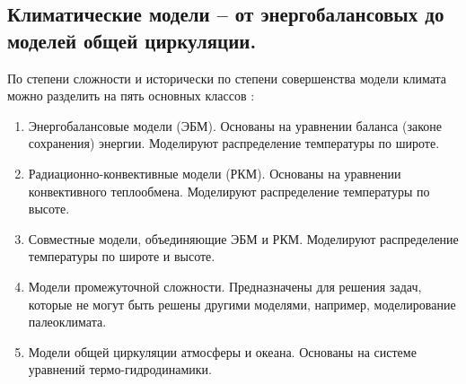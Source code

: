 \subsection{Климатические модели -- от энергобалансовых до моделей общей циркуляции.}
По степени сложности и исторически по степени совершенства модели климата можно разделить на пять основных классов \cite{Лобанов-2018}:
\begin{enumerate}
\item Энергобалансовые модели (ЭБМ). Основаны на уравнении баланса (законе сохранения) энергии. Моделируют распределение температуры по широте.
\item Радиационно-конвективные модели (РКМ). Основаны на уравнении конвективного теплообмена. Моделируют распределение температуры по высоте.
\item Совместные модели, объединяющие ЭБМ и РКМ. Моделируют распределение температуры по широте и высоте.
\item Модели промежуточной сложности. Предназначены для решения задач, которые не могут быть решены другими моделями, например, моделирование палеоклимата.
\item Модели общей циркуляции атмосферы и океана. Основаны на системе уравнений термо-гидродинамики.
\end{enumerate}
